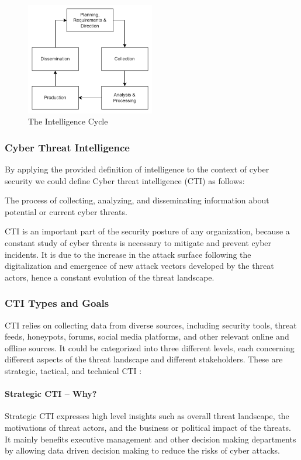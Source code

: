 \begin{figure}[ht]
    \centering
    \includegraphics[width=0.5\textwidth]{diagrams/background/intelligence-cycle.png}
    \caption{The Intelligence Cycle \cite{lee_cyber_2023}}
    \label{fig:cti-lifecycle}
\end{figure}

\subsubsection{Cyber Threat Intelligence}
By applying the provided definition of intelligence to the context of cyber security we could define Cyber threat intelligence (CTI) as follows:

\smallskip
The process of collecting, analyzing, and disseminating information about potential or current cyber threats. 

CTI is an important part of the security posture of any organization, because a constant study of cyber threats is necessary to mitigate and prevent cyber incidents.
It is due to the increase in the attack surface following the digitalization and emergence of new attack vectors developed by the threat actors, hence a constant evolution of the threat landscape.

\subsubsection{CTI Types and Goals}
CTI relies on collecting data from diverse sources, including security tools, threat feeds, honeypots, forums, social media platforms, and other relevant online and offline sources. It could be categorized into three different levels, each concerning different aspects of the threat landscape and different stakeholders. These are strategic, tactical, and technical CTI \cite{lee_cyber_2023}:

\paragraph{Strategic CTI -- Why?}
Strategic CTI expresses high level insights such as overall threat landscape, the motivations of threat actors, and the business or political impact of the threats. It mainly benefits executive management and other decision making departments by allowing data driven decision making to reduce the risks of cyber attacks.


